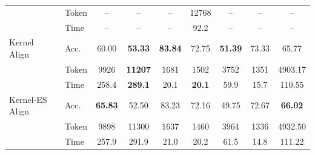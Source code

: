 \documentclass{article} %
\begin{document}
\begin{table}[t]
{{\begin{tabular}{@{}ll*{7}{c}@{}}
 & Token & -- & -- & -- & 12768 & -- & -- & -- \\
 & Time & -- & -- & -- & 92.2 & -- & -- & -- \\
\midrule
Kernel Align & Acc. & 60.00 & \textbf{53.33} & \textbf{83.84} & 72.75 & \textbf{51.39} & 73.33 & 65.77 \\
 & Token & 9926 & \textbf{11207} & 1681 & 1502 & 3752 & 1351 & 4903.17 \\
 & Time & 258.4 & \textbf{289.1} & 20.1 & \textbf{20.1} & 59.9 & 15.7 & 110.55 \\
\midrule
Kernel-ES Align & Acc. & \textbf{65.83} & 52.50 & 83.23 & 72.16 & 49.75 & 72.67 & \textbf{66.02} \\
 & Token & 9898 & 11300 & 1637 & 1460 & 3964 & 1336 & 4932.50 \\
 & Time & 257.9 & 291.9 & 21.0 & 20.2 & 61.5 & 14.8 & 111.22 \\
\bottomrule
\end{tabular}%
}%
}
\end{table}
\end{document}

